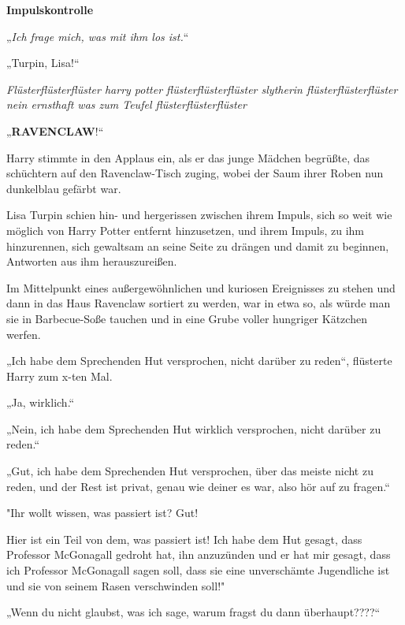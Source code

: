

\hypertarget{impulskontrolle}{%

\textbf{Impulskontrolle}

„\emph{Ich frage mich, was mit ihm los ist.}“

„Turpin, Lisa!“

\emph{Flüsterflüsterflüster harry potter flüsterflüsterflüster slytherin flüsterflüsterflüster nein ernsthaft was zum Teufel flüsterflüsterflüster}

„\textbf{RAVENCLAW}!“

Harry stimmte in den Applaus ein, als er das junge Mädchen begrüßte, das schüchtern auf den Ravenclaw-Tisch zuging, wobei der Saum ihrer Roben nun dunkelblau gefärbt war.

Lisa Turpin schien hin- und hergerissen zwischen ihrem Impuls, sich so weit wie möglich von Harry Potter entfernt hinzusetzen, und ihrem Impuls, zu ihm hinzurennen, sich gewaltsam an seine Seite zu drängen und damit zu beginnen, Antworten aus ihm herauszureißen.

Im Mittelpunkt eines außergewöhnlichen und kuriosen Ereignisses zu stehen und dann in das Haus Ravenclaw sortiert zu werden, war in etwa so, als würde man sie in Barbecue-Soße tauchen und in eine Grube voller hungriger Kätzchen werfen.

„Ich habe dem Sprechenden Hut versprochen, nicht darüber zu reden“, flüsterte Harry zum x-ten Mal.

„Ja, wirklich.“

„Nein, ich habe dem Sprechenden Hut wirklich versprochen, nicht darüber zu reden.“

„Gut, ich habe dem Sprechenden Hut versprochen, über das meiste nicht zu reden, und der Rest ist privat, genau wie deiner es war, also hör auf zu fragen.“

"Ihr wollt wissen, was passiert ist? Gut!

Hier ist ein Teil von dem, was passiert ist! Ich habe dem Hut gesagt, dass Professor McGonagall gedroht hat, ihn anzuzünden und er hat mir gesagt, dass ich Professor McGonagall sagen soll, dass sie eine unverschämte Jugendliche ist und sie von seinem Rasen verschwinden soll!"

„Wenn du nicht glaubst, was ich sage, warum fragst du dann überhaupt????“

}
